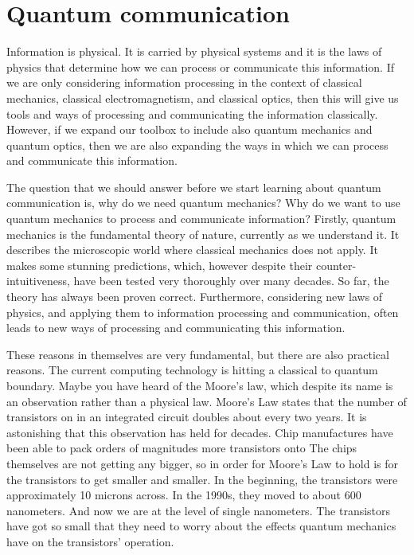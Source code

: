 \section{Quantum communication}

Information is physical.
It is carried by physical systems and it is the laws of physics that determine how we can process or communicate this information.
If we are only considering information processing in the context of classical mechanics, classical electromagnetism, and classical optics, then this will give us tools and ways of processing and communicating the information classically.
However, if we expand our toolbox to include also quantum mechanics and quantum optics, then we are also expanding the ways in which we can process and communicate this information.

The question that we should answer before we start learning about quantum communication is, why do we need quantum mechanics?
Why do we want to use quantum mechanics to process and communicate information? Firstly, quantum mechanics is the fundamental theory of nature, currently as we understand it.
It describes the microscopic world where classical mechanics does not apply.
It makes some stunning predictions, which, however despite their counter-intuitiveness, have been tested very thoroughly over many decades.
So far, the theory has always been proven correct.
Furthermore, considering new laws of physics, and applying them to information processing and communication, often leads to new ways of processing and communicating this information.

These reasons in themselves are very fundamental, but there are also practical reasons.
The current computing technology is hitting a classical to quantum boundary.
Maybe you have heard of the Moore's law, which despite its name is an observation rather than a physical law.
Moore's Law states that the number of transistors on in an integrated circuit doubles about every two years.
It is astonishing that this observation has held for decades.
Chip manufactures have been able to pack orders of magnitudes more transistors onto The chips themselves are not getting any bigger, so in order for Moore's Law to hold is for the transistors to get smaller and smaller.
In the beginning, the transistors were approximately 10 microns across.
In the 1990s, they moved to about 600 nanometers.
And now we are at the level of single nanometers.
The transistors have got so small that they need to worry about the effects quantum mechanics have on the transistors' operation.

